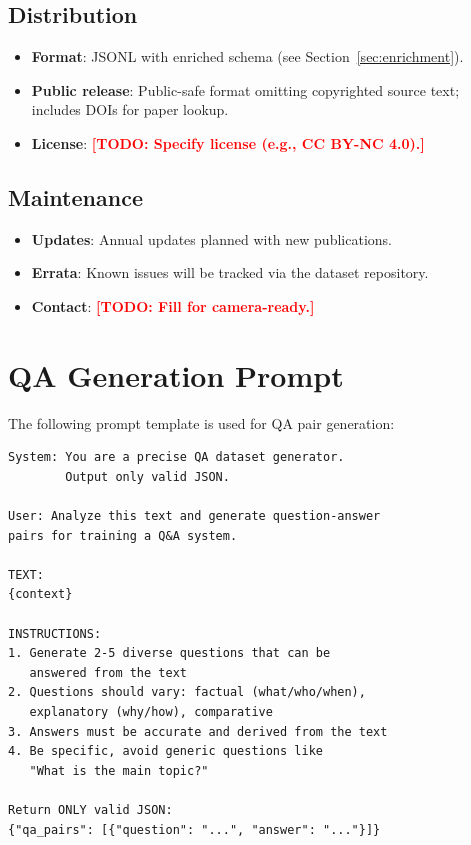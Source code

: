 \documentclass[11pt]{article}
\newcommand{\todo}[1]{\textcolor{red}{\textbf{[TODO: #1]}}}
\begin{document}
\subsection{Distribution}

\begin{itemize}[leftmargin=*,itemsep=2pt]
    \item \textbf{Format}: JSONL with enriched schema (see Section~\ref{sec:enrichment}).
    \item \textbf{Public release}: Public-safe format omitting copyrighted source text; includes DOIs for paper lookup.
    \item \textbf{License}: \todo{Specify license (e.g., CC BY-NC 4.0).}
\end{itemize}

\subsection{Maintenance}

\begin{itemize}[leftmargin=*,itemsep=2pt]
    \item \textbf{Updates}: Annual updates planned with new publications.
    \item \textbf{Errata}: Known issues will be tracked via the dataset repository.
    \item \textbf{Contact}: \todo{Fill for camera-ready.}
\end{itemize}

\section{QA Generation Prompt}
\label{app:prompt}

The following prompt template is used for QA pair generation:

\begin{verbatim}
System: You are a precise QA dataset generator.
        Output only valid JSON.

User: Analyze this text and generate question-answer
pairs for training a Q&A system.

TEXT:
{context}

INSTRUCTIONS:
1. Generate 2-5 diverse questions that can be
   answered from the text
2. Questions should vary: factual (what/who/when),
   explanatory (why/how), comparative
3. Answers must be accurate and derived from the text
4. Be specific, avoid generic questions like
   "What is the main topic?"

Return ONLY valid JSON:
{"qa_pairs": [{"question": "...", "answer": "..."}]}
\end{verbatim}
\end{document}
